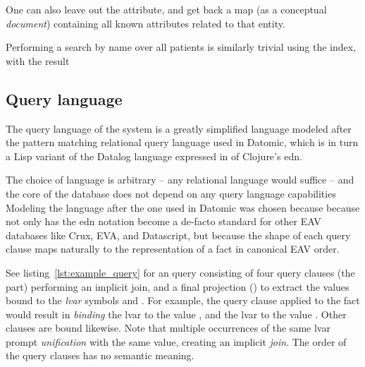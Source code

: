 \begin{center}
\end{center}

One can also leave out the attribute, and get back a map (as a conceptual \emph{document}) containing all known attributes related to that entity.

\begin{center}
\end{center}

Performing a search by name over all patients is similarly trivial using the  index, with the result

\begin{center}
\end{center}


\cleardoublepage
\subsection{Query language}\label{sec:query_language}

The query language of the system is a greatly simplified language modeled after the pattern matching relational query language used in Datomic, which is in turn a Lisp variant of the Datalog \cite{abiteboul1988datalog} language expressed in of Clojure's \gls{edn}.

The choice of language is arbitrary -- any relational language would suffice -- and the core of the database does not depend on any query language capabilities Modeling the language after the one used in Datomic was chosen because because not only has the edn notation become a de-facto standard for other EAV databases like Crux, EVA, and Datascript, but because the shape of each query clause maps naturally to the representation of a fact in canonical EAV order.

See listing~\ref{lst:example_query} for an query consisting of four query clauses (the  part) performing an implicit join, and a final projection () to extract the values bound to the \emph{\gls{lvar}} symbols  and . For example, the query clause  applied to the fact  would result in \emph{binding} the lvar  to the value , and the lvar  to the value . Other clauses are bound likewise. Note that multiple occurrences of the same lvar prompt \emph{unification} with the same value, creating an implicit \emph{join}. The order of the query clauses has no semantic meaning.

